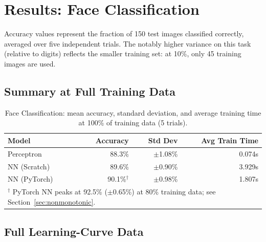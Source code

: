 \documentclass[12pt]{article}
\begin{document}
\section{Results: Face Classification}
\label{sec:results_faces}

Accuracy values represent the fraction of 150 test images classified correctly, averaged
over five independent trials. The notably higher variance on this task (relative to
digits) reflects the smaller training set: at 10\%, only 45 training images are used.

\subsection{Summary at Full Training Data}

\begin{table}[H]
\centering
\caption{Face Classification: mean accuracy, standard deviation, and average training
time at 100\% of training data (5 trials).}
\label{tab:faces_summary}
\begin{tabular}{lrrr}
\toprule
\textbf{Model} & \textbf{Accuracy} & \textbf{Std Dev} & \textbf{Avg Train Time} \\
\midrule
Perceptron     & 88.3\%            & $\pm$1.08\%      & 0.074s \\
NN (Scratch)   & 89.6\%            & $\pm$0.90\%      & 3.929s \\
NN (PyTorch)   & 90.1\%$^{\dagger}$ & $\pm$0.98\%    & 1.807s \\
\bottomrule
\multicolumn{4}{l}{\footnotesize $^\dagger$ PyTorch NN peaks at 92.5\% ($\pm$0.65\%) at 80\% training data; see
Section~\ref{sec:nonmonotonic}.}
\end{tabular}
\end{table}

\subsection{Full Learning-Curve Data}
\end{document}
